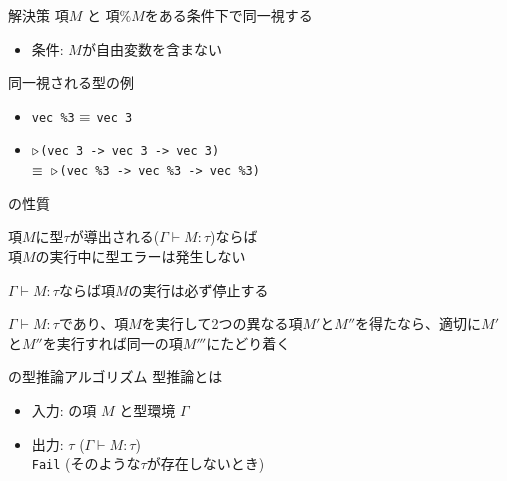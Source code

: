 \documentclass[dvipdfmx,aspectratio=169, 20pt]{beamer}
\begin{document}
\begin{frame}[fragile]{解決策}
    項\( M \) と 項\( \%M \)をある条件下で同一視する
    \begin{itemize}
        \item 条件: \( M \)が自由変数を含まない
    \end{itemize}
    \begin{exampleblock}{同一視される型の例}
        \begin{itemize}
            \item \verb|vec %3| \( \equiv \) \verb|vec 3|
            \item \({\mathop{\triangleright}}\)\verb|(vec 3 -> vec 3 -> vec 3)| \\
                \( \equiv \)\ \({\mathop{\triangleright}}\)\verb|(vec %3 -> vec %3 -> vec %3)|
        \end{itemize}
    \end{exampleblock}
\end{frame}

\begin{frame}[fragile]{\LMD の性質}
    \begin{theorem}[型安全性]
        項\(M\)に型\(\tau\)が導出される(\(\Gamma \vdash M : \tau \))ならば\\
        項\(M\)の実行中に型エラーは発生しない
    \end{theorem}
    \begin{theorem}[強正規化性]
        \(\Gamma \vdash M : \tau \)ならば項\(M\)の実行は必ず停止する
    \end{theorem}
    \begin{theorem}[合流性]
        \(\Gamma \vdash M : \tau \)であり、項\(M\)を実行して2つの異なる項\(M'\)と\(M''\)を得たなら、適切に\(M'\)と\(M''\)を実行すれば同一の項\(M'''\)にたどり着く
    \end{theorem}
\end{frame}

\begin{frame}[fragile]{\LMD の型推論アルゴリズム}
    型推論とは
    \begin{itemize}
        \item 入力: \LMD の項 $M$ と型環境 $\Gamma$
        \item 出力: \( \tau \) \hspace{10mm} (\( \Gamma \vdash M : \tau \)) \\
            \hspace{10mm} \hspace{2mm} {\tt Fail} \hspace{1mm} (そのような\( \tau \)が存在しないとき)
    \end{itemize}

\end{frame}
\end{document}
